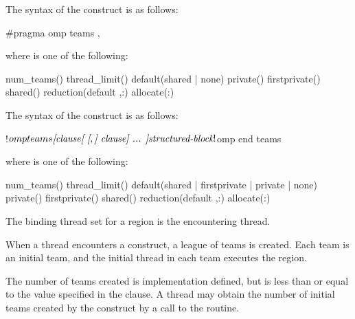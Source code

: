 \syntax
\begin{ccppspecific}
The syntax of the  construct is as follows:

\begin{ompcPragma}
#pragma omp teams \plc{[clause[ [},\plc{] clause] ... ] new-line}
\end{ompcPragma}

where  is one of the following:

\begin{indentedcodelist}
num_teams()
thread_limit()
default(shared \textnormal{|} none)
private()
firstprivate()
shared()
reduction(\plc{[}default ,\plc{] reduction-identifier }:)
allocate(\plc{[allocator }:\plc{] list})
\end{indentedcodelist}
\end{ccppspecific}

\begin{fortranspecific}
The syntax of the  construct is as follows:

\begin{ompfPragma}
!$omp teams \plc{[clause[ [},\plc{] clause] ... ]}
    \plc{structured-block}
!$omp end teams
\end{ompfPragma}


where  is one of the following:

\begin{indentedcodelist}
num_teams()
thread_limit()
default(shared \textnormal{|} firstprivate \textnormal{|} private \textnormal{|} none)
private()
firstprivate()
shared()
reduction(\plc{[}default ,\plc{] reduction-identifier }:)
allocate(\plc{[allocator }:\plc{] list})
\end{indentedcodelist}

\end{fortranspecific}

\begin{samepage}

\binding
The binding thread set for a  region is the encountering thread.

\descr
When a thread encounters a  construct, a league of teams is
created. Each team is an initial team, and the initial thread in each team
executes the  region.

The number of teams created is implementation defined, but is less than or 
equal to the value specified in the  clause. A thread may 
obtain the number of initial teams created by the construct by a call to 
the  routine.

\end{samepage}

